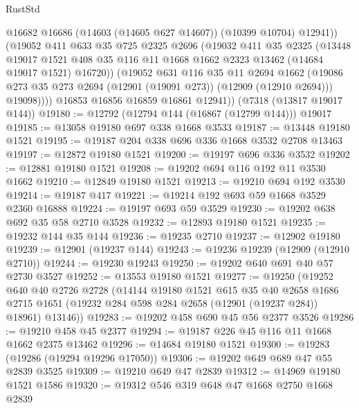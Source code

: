 \begin{lexlean}{RustStd}
\begin{coremodule}
                @16682
                @16686
                (@14603 (@14605 @627 @14607))
                (@10399 @10704)
                @12941))
            (@19052
              @411
              @633
              @35
              @725
              @2325
              @2696
              (@19032
                @411
                @35
                @2325
                (@13448
                  @19017
                  @1521
                  @408
                  @35
                  @116
                  @11
                  @1668
                  @1662
                  @2323
                  @13462
                  (@14684 @19017 @1521)
                  @16720))
              (@19052
                @631
                @116
                @35
                @11
                @2694
                @1662
                (@19086 @273 @35 @273 @2694 (@12901 (@19091 @273)) (@12909 (@12910 @2694)))
                @19098))))
        @16853
        @16856
        @16859
        @16861
        @12941))
    (@7318 (@13817 @19017 @144))
@19180 := @12792 (@12794 @144 (@16867 (@12799 @144))) @19017
@19185 := @13058 @19180 @697 @338 @1668 @3533
@19187 := @13448 @19180 @1521
@19195 := @19187 @204 @338 @696 @336 @1668 @3532 @2708 @13463
@19197 := @12872 @19180 @1521
@19200 := @19197 @696 @336 @3532
@19202 := @12881 @19180 @1521
@19208 := @19202 @694 @116 @192 @11 @3530 @1662
@19210 := @12849 @19180 @1521
@19213 := @19210 @694 @192 @3530
@19214 := @19187 @417
@19221 := @19214 @192 @693 @59 @1668 @3529 @2360 @16888
@19224 := @19197 @693 @59 @3529
@19230 := @19202 @638 @692 @35 @58 @2710 @3528
@19232 := @12893 @19180 @1521
@19235 := @19232 @144 @35 @144
@19236 := @19235 @2710
@19237 := @12902 @19180
@19239 := @12901 (@19237 @144)
@19243 := @19236 @19239 (@12909 (@12910 @2710))
@19244 := @19230 @19243
@19250 := @19202 @640 @691 @40 @57 @2730 @3527
@19252 := @13553 @19180 @1521
@19277 := @19250
    (@19252
      @640
      @40
      @2726
      @2728
      (@14144
        @19180
        @1521
        @615
        @35
        @40
        @2658
        @1686
        @2715
        @1651
        (@19232 @284 @598 @284 @2658 (@12901 (@19237 @284)) @18961)
        @13146))
@19283 := @19202 @458 @690 @45 @56 @2377 @3526
@19286 := @19210 @458 @45 @2377
@19294 := @19187 @226 @45 @116 @11 @1668 @1662 @2375 @13462
@19296 := @14684 @19180 @1521
@19300 := @19283 (@19286 (@19294 @19296 @17050))
@19306 := @19202 @649 @689 @47 @55 @2839 @3525
@19309 := @19210 @649 @47 @2839
@19312 := @14969 @19180 @1521 @1586
@19320 := @19312 @546 @319 @648 @47 @1668 @2750 @1668 @2839

\end{coremodule}
\end{lexlean}
